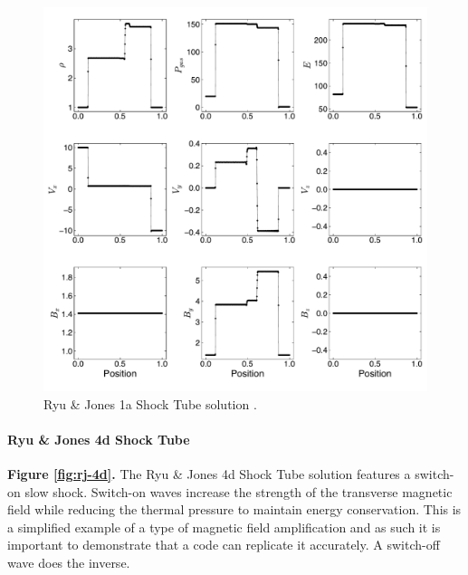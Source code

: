 \documentclass[modern, linenumbers]{aastex631}
\newcommand*{\img}[1]{%
    \raisebox{-.3\baselineskip}{%
        \texttt{[image: \#1]}%
    }%
}
\begin{document}
\begin{figure}[ht!]
    \includegraphics[width=\linewidth]{rj1a.pdf}
    \caption{Ryu \& Jones 1a Shock Tube solution \citep{ryu_jones_1995}.
    \href{https://github.com/bcaddy/caddy-et-al-2023/blob/4c9c5ef905902e54e50943d0a261bd5b08342225/python/shock-tubes.py}{\img{github.png}}}
    \label{fig:rj-1a}
\end{figure}

\paragraph{Ryu \& Jones 4d Shock Tube}
\textbf{Figure \ref{fig:rj-4d}.}
The Ryu \& Jones 4d Shock Tube solution \citep{ryu_jones_1995} features a switch-on slow shock. Switch-on waves increase the strength of the transverse magnetic field while reducing the thermal pressure to maintain energy conservation. This is a simplified example of a type of magnetic field amplification and as such it is important to demonstrate that a code can replicate it accurately. A switch-off wave does the inverse.
\end{document}
